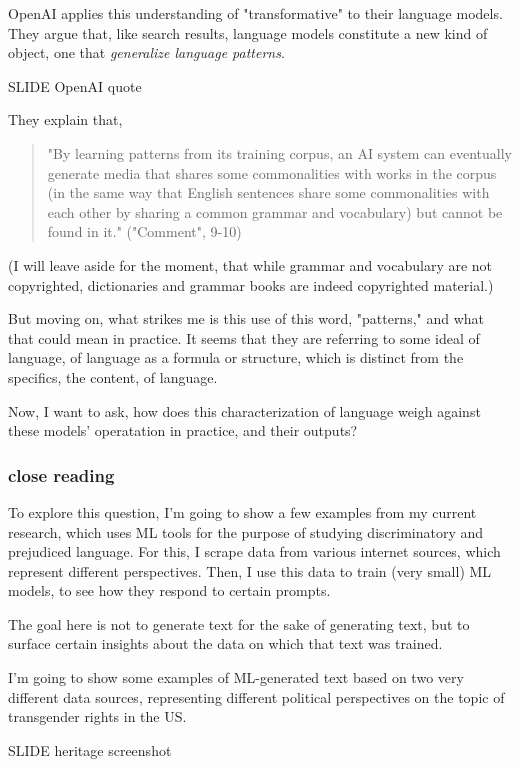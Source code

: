 \documentclass[11pt]{article}
\begin{document}
OpenAI applies this understanding of "transformative" to their
language models. They argue that, like search results, language models
constitute a new kind of object, one that \emph{generalize language
patterns}.

SLIDE OpenAI quote

They explain that,

\begin{quote}
"By learning patterns from its training corpus, an AI system can
eventually generate media that shares some commonalities with works in
the corpus (in the same way that English sentences share some
commonalities with each other by sharing a common grammar and
vocabulary) but cannot be found in it." ("Comment", 9-10)
\end{quote}

(I will leave aside for the moment, that while grammar and vocabulary
are not copyrighted, dictionaries and grammar books are indeed
copyrighted material.)

But moving on, what strikes me is this use of this word, "patterns,"
and what that could mean in practice. It seems that they are referring
to some ideal of language, of language as a formula or structure,
which is distinct from the specifics, the content, of language.

Now, I want to ask, how does this characterization of language weigh
against these models' operatation in practice, and their outputs?

\subsubsection{close reading}
\label{sec:org1281e4d}
To explore this question, I'm going to show a few examples from my
current research, which uses ML tools for the purpose of studying
discriminatory and prejudiced language. For this, I scrape data from
various internet sources, which represent different perspectives.
Then, I use this data to train (very small) ML models, to see how they
respond to certain prompts.

The goal here is not to generate text for the sake of generating text,
but to surface certain insights about the data on which that text was
trained.

I'm going to show some examples of ML-generated text based on two very
different data sources, representing different political perspectives
on the topic of transgender rights in the US.

SLIDE heritage screenshot
\end{document}
